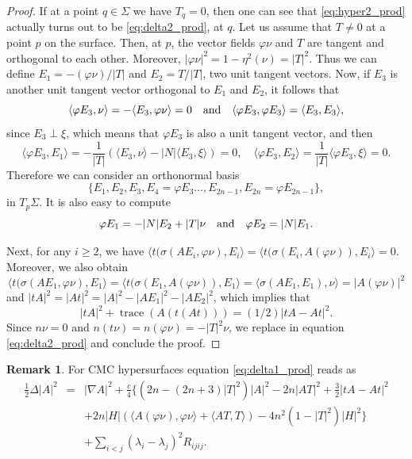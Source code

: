 \documentclass[11pt]{amsart}
\theoremstyle{plain}
\theoremstyle{definition}
\newtheorem{remark}       [theorem]  {Remark}
\DeclareMathOperator{\trace}{trace} \DeclareMathOperator{\di}{div}
\numberwithin{equation}{section}
\begin{document}
\begin{proof} If at a point $q\in\Sigma$ we have $T_q=0$, then one can see that \eqref{eq:hyper2_prod} actually turns out to be \eqref{eq:delta2_prod}, at $q$. Let us assume that $T\neq 0$  at a point $p$ on the surface. Then, at $p$, the vector fields $\varphi\nu$ and $T$ are tangent and orthogonal to each other. Moreover, $|\varphi\nu|^2=1-\eta^2(\nu)=|T|^2$. Thus we can define $E_1=-(\varphi\nu)/|T|$ and $E_2=T/|T|$, two unit tangent vectors. Now, if $E_3$ is another unit tangent vector orthogonal to $E_1$ and $E_2$, it follows that
$$
\langle\varphi E_3,\nu\rangle=-\langle E_3,\varphi\nu\rangle=0\quad\textnormal{and}\quad \langle\varphi E_3,\varphi E_3\rangle=\langle E_3,E_3\rangle,
$$
since $E_3\perp\xi$, which means that $\varphi E_3$ is also a unit tangent vector, and then
$$
\langle\varphi E_3,E_1\rangle=-\frac{1}{|T|}(\langle E_3,\nu\rangle-|N|\langle E_3,\xi\rangle)=0,\quad\langle\varphi E_3,E_2\rangle=\frac{1}{|T|}\langle\varphi E_3,\xi\rangle=0.
$$ 
Therefore we can consider an orthonormal basis
$$
\{E_1,E_2,E_3,E_4=\varphi E_3\ldots,E_{2n-1},E_{2n}=\varphi E_{2n-1}\},
$$
in $T_p\Sigma$. It is also easy to compute 
$$
\varphi E_1=-|N|E_2+|T|\nu\quad\textnormal{and}\quad\varphi E_2=|N|E_1.
$$

Next, for any $i\geq 2$, we have $\langle t(\sigma(AE_i,\varphi\nu),E_i\rangle=\langle t(\sigma(E_i,A(\varphi\nu)),E_i\rangle=0$. Moreover, we also obtain 
$$
\langle t(\sigma(AE_1,\varphi\nu),E_1\rangle=\langle t(\sigma(E_1,A(\varphi\nu)),E_1\rangle=\langle\sigma(AE_1,E_1),\nu\rangle=|A(\varphi\nu)|^2
$$
and $|tA|^2=|At|^2=|A|^2-|AE_1|^2-|AE_2|^2$, which implies that 
$$
|tA|^2+\trace(A(t(At)))=(1/2)|tA-At|^2.
$$
Since $n\nu=0$ and $n(t\nu)=n(\varphi\nu)=-|T|^2\nu$, we replace in equation \eqref{eq:delta2_prod} and conclude the proof.
\end{proof} 

\begin{remark} For CMC hypersurfaces equation \eqref{eq:delta1_prod} reads as
\begin{eqnarray}\label{eq:hyper1_prod}
\frac{1}{2}\Delta|A|^2&=&|\nabla A|^2+\frac{c}{4}\{(2n-(2n+3)|T|^2)|A|^2-2n|AT|^2+\frac{3}{2}|tA-At|^2\\\nonumber&&+2n|H|(\langle A(\varphi\nu),\varphi\nu\rangle+\langle AT,T\rangle)-4n^2(1-|T|^2)|H|^2\}\\\nonumber &&+\sum_{i<j}(\lambda_i-\lambda_j)^2R_{ijij}.
\end{eqnarray}
\end{remark}
\end{document}
